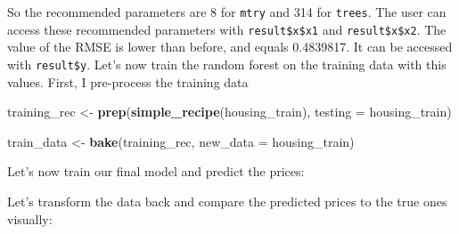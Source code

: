 \documentclass[]{gitbook}
\newenvironment{Shaded}{\begin{snugshade}}{\end{snugshade}}
\newcommand{\DataTypeTok}[1]{\textcolor[rgb]{0.13,0.29,0.53}{#1}}
\newcommand{\KeywordTok}[1]{\textcolor[rgb]{0.13,0.29,0.53}{\textbf{#1}}}
\newcommand{\NormalTok}[1]{#1}
\newcommand{\OperatorTok}[1]{\textcolor[rgb]{0.81,0.36,0.00}{\textbf{#1}}}
\newcommand{\StringTok}[1]{\textcolor[rgb]{0.31,0.60,0.02}{#1}}
\begin{document}
So the recommended parameters are 8 for \texttt{mtry} and 314 for \texttt{trees}. The
user can access these recommended parameters with \texttt{result\$x\$x1} and \texttt{result\$x\$x2}.
The value of the RMSE is lower than before, and equals 0.4839817. It can be accessed with
\texttt{result\$y}.
Let's now train the random forest on the training data with this values. First, I pre-process the
training data

\begin{Shaded}
\begin{Highlighting}[]
\NormalTok{training_rec <-}\StringTok{ }\KeywordTok{prep}\NormalTok{(}\KeywordTok{simple_recipe}\NormalTok{(housing_train), }\DataTypeTok{testing =}\NormalTok{ housing_train)}

\NormalTok{train_data <-}\StringTok{ }\KeywordTok{bake}\NormalTok{(training_rec, }\DataTypeTok{new_data =}\NormalTok{ housing_train)}
\end{Highlighting}
\end{Shaded}

Let's now train our final model and predict the prices:

\begin{Shaded}
\end{Shaded}

Let's transform the data back and compare the predicted prices to the true ones visually:

\begin{Shaded}
\end{Shaded}
\end{document}
